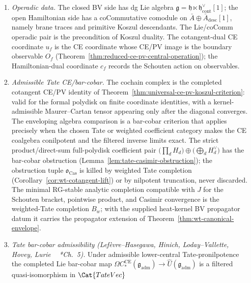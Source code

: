 \documentclass[11pt]{memoir}
\begin{document}
\begin{enumerate}[wide=0pt,leftmargin=*]
  \item \emph{Operadic data.}  The closed BV side has dg Lie algebra
    \(\mathfrak g=\mathfrak h\ltimes\mathfrak h^\vee_{\mathrm{cont}}[1]\);
    the open Hamiltonian side has a coCommutative comodule on
    \(\bar A\oplus\bar A_{\mathrm{desc}}[1]\), namely brane traces
    and primitive Koszul descendants.  The Lie/coComm operadic pair
    is the precondition of Koszul duality.  The cotangent-dual CE
    coordinate \(u_f\) is the CE coordinate whose CE/PV image is the
    boundary observable \(O_f\)
    (Theorem~\ref{thm:reduced-ce-pv-central-operation}); the
    Hamiltonian-dual coordinate \(c_f\) records the Schouten action
    on observables.
  \item \emph{Admissible Tate CE/bar-cobar.}  The cochain complex is
    the completed cotangent CE/PV identity of
    Theorem~\ref{thm:universal-ce-pv-koszul-criterion}: valid for the
	    formal polydisk on finite coordinate identities, with a kernel-admissible
    Maurer--Cartan tensor appearing only after the diagonal converges.
    The enveloping algebra comparison is a bar-cobar criterion that applies
    precisely when the chosen Tate or weighted coefficient category
    makes the CE coalgebra conilpotent and the filtered inverse
    limits exact.  The strict product/direct-sum full-polydisk coefficient
    pair \(\bigl(\prod_dH_d\bigr)\oplus\bigl(\bigoplus_dH_d^\vee\bigr)\)
    has the bar-cobar obstruction
    (Lemma~\ref{lem:tate-casimir-obstruction}); the obstruction tuple
    \(\mathfrak o_{\mathrm{Cas}}\) is killed by weighted Tate
    completion (Corollary~\ref{cor:wt-cotangent-lift}) or by nilpotent
    truncation, never discarded.  The minimal RG-stable analytic
    completion compatible with \(J\) for the Schouten bracket, pointwise
    product, and Casimir convergence is the weighted-Tate completion
    \(B_w\); with the supplied heat-kernel BV propagator datum it carries
    the propagator extension of
    Theorem~\ref{thm:wt-canonical-envelope}.
  \item \emph{Tate bar-cobar admissibility
    (Lef\`evre--Hasegawa, Hinich, Loday--Vallette, Hovey, Lurie
    ~\cite{lefevre-hasegawa}\cite{hinich-htpy-alg}
    \cite{loday-vallette}\cite{hovey}\cite{lurie-ha}*{Ch.~5}).}
    Under admissible lower-central Tate-pronilpotence the completed
    Lie bar-cobar map
    \(\Omega C^{\mathrm{CE}}_*(\mathfrak g_{\mathrm{adm}})\to
    \widehat U(\mathfrak g_{\mathrm{adm}})\) is a filtered
    quasi-isomorphism in \(\Cat{TateVec}\)

\end{enumerate}
\end{document}
